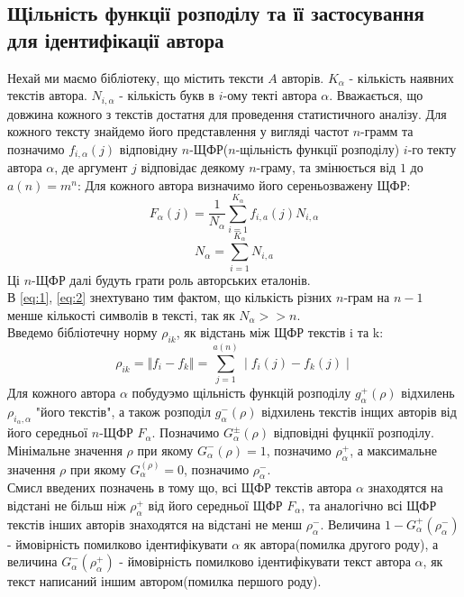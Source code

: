 \documentclass[12pt, a4paper]{extarticle}
\begin{document}
\subsection{Щільність функції розподілу та її застосування для ідентифікації автора}
Нехай ми маємо бібліотеку, що містить тексти $A$ авторів. $K_\alpha$ - кількість наявних текстів автора. $N_{i,\alpha}$ - кількість букв в $i$-ому текті автора $\alpha$. Вважається, що довжина кожного з текстів достатня для проведення статистичного аналізу. Для кожного тексту знайдемо його представлення у вигляді частот $n$-грамм та позначимо $f_{i,\alpha}(j)$ відповідну $n$-ЩФР($n$-щільність функції розподілу) $i$-го текту автора $\alpha$, де аргумент $j$ відповідає деякому $n$-граму, та змінюється від $1$ до $a(n)=m^n$:
Для кожного автора визначимо його сереньозважену ЩФР\cite{Authoridentificationinshorttexts}:
\begin{equation} \label{eq:1}
F_{\alpha}(j) = \frac{1}{N_\alpha} \sum_{i=1}^{K_\alpha}f_{i,a}(j)N_{i,\alpha} 
\end{equation}
\begin{equation}\label{eq:2}
N_\alpha  = \sum_{i=1}^{K_\alpha}N_{i,a}
\end{equation}
Ці $n$-ЩФР далі будуть грати роль авторських еталонів.\\
В \ref{eq:1}, \ref{eq:2} знехтувано тим фактом, що кількість різних $n$-грам на $n-1$ менше кількості символів в тексті, так як $N_\alpha >> n$.\\
Введемо бібліотечну норму $\rho_{ik}$, як відстань між ЩФР текстів i та k:
\begin{equation}\label{eq:3}
\rho_{ik} = \Vert f_i - f_k\Vert = \sum_{j=1}^{a(n)}\mid f_i(j) - f_k(j)\mid
\end{equation}
Для кожного автора $\alpha$ побудуэмо щільність функцій розподілу $g_\alpha^+(\rho)$ відхилень $\rho_{i_\alpha,\alpha}$ "його текстів", а також розподіл $g_\alpha^-(\rho)$ відхилень текстів інщих авторів від його середньої $n$-ЩФР $F_\alpha$. Позначимо $G_\alpha^{\pm}(\rho)$ відповідні фуцнкії розподілу. Мінімальне значення $\rho$ при якому $G_\alpha^-(\rho)=1$, позначимо $\rho_\alpha^+$, а максимальне значення $\rho$ при якому $G_\alpha^(\rho)=0$, позначимо $\rho_\alpha^-$.\\
Смисл введених позначень в тому що, всі ЩФР текстів автора $\alpha$ знаходятся на відстані не більш ніж $\rho_\alpha^+$ від його середньої ЩФР $F_{\alpha}$, та аналогічно всі ЩФР текстів інших авторів знаходятся на відстані не менш $\rho_\alpha^-$. Величина $1-G_\alpha^+(\rho_\alpha^-)$ - ймовірність помилково ідентифікувати $\alpha$ як автора(помилка другого роду), а величина $G_\alpha^-(\rho_\alpha^+)$ - ймовірність помилково ідентифікувати текст автора $\alpha$, як текст написаний іншим автором(помилка першого роду).
\end{document}
